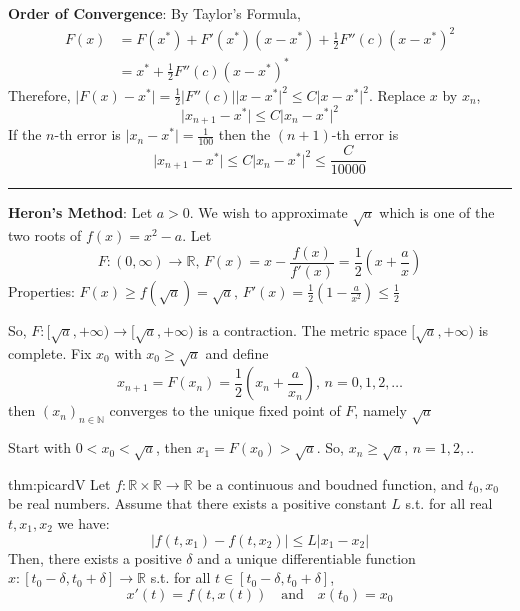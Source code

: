 \documentclass[landscape, 8pt]{extarticle}
\begin{document}
\begin{multicols}{3}
\textbf{Order of Convergence}: By Taylor's Formula,
\begin{align*}
    F(x) &= F(x^{*}) + F'(x^{*})(x - x^{*}) + \frac{1}{2} F''(c)(x - x^{*})^{2} \\
         &= x^{*} + \frac{1}{2} F''(c)(x - x^{*})^{*}
\end{align*}
Therefore, $\lvert F(x) - x^{*} \rvert = \frac{1}{2} \lvert F''(c) \rvert \lvert x - x^{*} \rvert^{2} \le C\lvert x - x^{*} \rvert^{2}$. Replace $x$ by $x_{n}$,
\[\lvert x_{n + 1} - x^{*} \rvert \le C \lvert x_{n} - x^{*} \rvert^{2}\]
If the $n$-th error is $\lvert x_{n} - x^{*} \rvert = \frac{1}{100}$ then the $(n+1)$-th error is
\[\lvert x_{n+1} - x^{*} \rvert \le C\lvert x_{n} - x^{*} \rvert^{2} \le \frac{C}{10000}\]

\vspace{-5pt}
\noindent\rule{0.3\textwidth}{0.5pt}


\textbf{Heron's Method}: Let $a > 0$. We wish to approximate $\sqrt{a}$ which is one of the two roots of $f(x) = x^{2} - a$. Let
\[F : (0, \infty)\to \mathbb{R},\, F(x) = x - \frac{f(x)}{f'(x)} = \frac{1}{2}\left(x + \frac{a}{x}\right)\]
Properties: $\displaystyle F(x) \ge f(\sqrt{a}) = \sqrt{a},\,F'(x) = \frac{1}{2}\left(1 - \frac{a}{x^{2}}\right) \le \frac{1}{2}$

So, $F : [\sqrt{a}, +\infty) \to [\sqrt{a}, +\infty)$ is a contraction. The metric space $[\sqrt{a}, +\infty)$ is complete. Fix $x_{0}$ with $x_{0} \ge \sqrt{a}$ and define
\[x_{n+1} = F(x_{n}) = \frac{1}{2}\left(x_{n} + \frac{a}{x_{n}}\right),\,n=0,1,2,\dots\]
then $(x_{n})_{n\in\mathbb{N}}$ converges to the unique fixed point of $F$, namely $\sqrt{a}$

Start with $0 < x_{0} < \sqrt{a}$, then $x_{1} = F(x_{0}) > \sqrt{a}$. So, $x_{n} \ge \sqrt{a},\,n=1,2,. .$


\begin{thm}{thm:picard}{V}
    Let $f : \mathbb{R} \times \mathbb{R} \to \mathbb{R}$ be a continuous and boudned function, and $t_{0}, x_{0}$ be real numbers. Assume that there exists a positive constant $L$ s.t. for all real $t, x_{1}, x_{2}$ we have:
    \[\lvert f(t, x_{1}) - f(t, x_{2}) \rvert \le L\lvert x_{1} - x_{2} \rvert\]
    Then, there exists a positive $\delta$ and a unique differentiable function $x : [t_{0} - \delta, t_{0} + \delta]\to \mathbb{R}$ s.t. for all $t\in [t_{0}-\delta, t_{0} + \delta]$,
    \[x'(t) = f(t, x(t)) \quad \text{and} \quad x(t_{0}) = x_{0}\]
\end{thm}



\end{multicols}
\end{document}
